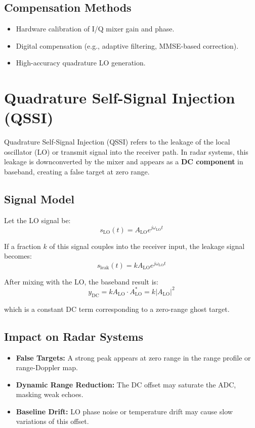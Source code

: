 \documentclass{article}
\begin{document}
\subsection{Compensation Methods}

\begin{itemize}
    \item Hardware calibration of I/Q mixer gain and phase.
    \item Digital compensation (e.g., adaptive filtering, MMSE-based correction).
    \item High-accuracy quadrature LO generation.
\end{itemize}
\section{Quadrature Self-Signal Injection (QSSI)}

Quadrature Self-Signal Injection (QSSI) refers to the leakage of the local oscillator (LO) or transmit signal 
into the receiver path. In radar systems, this leakage is downconverted by the mixer and appears 
as a \textbf{DC component} in baseband, creating a false target at zero range.

\subsection{Signal Model}

Let the LO signal be:
\[
s_\mathrm{LO}(t) = A_\mathrm{LO} e^{j\omega_\mathrm{LO} t}
\]

If a fraction \(k\) of this signal couples into the receiver input, the leakage signal becomes:
\[
s_\mathrm{leak}(t) = k A_\mathrm{LO} e^{j\omega_\mathrm{LO} t}
\]

After mixing with the LO, the baseband result is:
\[
y_\mathrm{DC} = k A_\mathrm{LO} \cdot A_\mathrm{LO}^* = k |A_\mathrm{LO}|^2
\]

which is a constant DC term corresponding to a zero-range ghost target.

\subsection{Impact on Radar Systems}

\begin{itemize}
    \item \textbf{False Targets:} A strong peak appears at zero range in the range profile or range-Doppler map.
    \item \textbf{Dynamic Range Reduction:} The DC offset may saturate the ADC, masking weak echoes.
    \item \textbf{Baseline Drift:} LO phase noise or temperature drift may cause slow variations of this offset.
\end{itemize}
\end{document}
